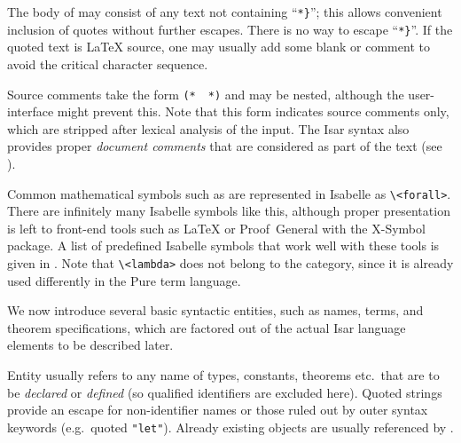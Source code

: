 \begin{isabellebody}
\begin{isamarkuptext}
  The body of \hyperlink{syntax.verbatim}{\mbox{}} may consist of any text not
  containing ``\verb|*|\verb|}|''; this allows
  convenient inclusion of quotes without further escapes.  There is no
  way to escape ``\verb|*|\verb|}|''.  If the quoted
  text is {\LaTeX} source, one may usually add some blank or comment
  to avoid the critical character sequence.

  Source comments take the form \verb|(*|~\isa{{\isachardoublequote}{\isasymdots}{\isachardoublequote}}~\verb|*)| and may be nested, although the user-interface
  might prevent this.  Note that this form indicates source comments
  only, which are stripped after lexical analysis of the input.  The
  Isar syntax also provides proper \emph{document comments} that are
  considered as part of the text (see ).

  Common mathematical symbols such as \isa{{\isasymforall}} are represented in
  Isabelle as \verb|\<forall>|.  There are infinitely many Isabelle
  symbols like this, although proper presentation is left to front-end
  tools such as {\LaTeX} or Proof~General with the X-Symbol package.
  A list of predefined Isabelle symbols that work well with these
  tools is given in .  Note that \verb|\<lambda>|
  does not belong to the  category, since it is already
  used differently in the Pure term language.%
\end{isamarkuptext}%
\isamarkuptrue%
%
\isamarkuptrue%
%
\begin{isamarkuptext}%
We now introduce several basic syntactic entities, such as names,
  terms, and theorem specifications, which are factored out of the
  actual Isar language elements to be described later.%
\end{isamarkuptext}%
\isamarkuptrue%
%
\isamarkuptrue%
%
\begin{isamarkuptext}%
Entity  usually refers to any name of types,
  constants, theorems etc.\ that are to be \emph{declared} or
  \emph{defined} (so qualified identifiers are excluded here).  Quoted
  strings provide an escape for non-identifier names or those ruled
  out by outer syntax keywords (e.g.\ quoted \verb|"let"|).
  Already existing objects are usually referenced by
  .


\end{isamarkuptext}
\end{isabellebody}
